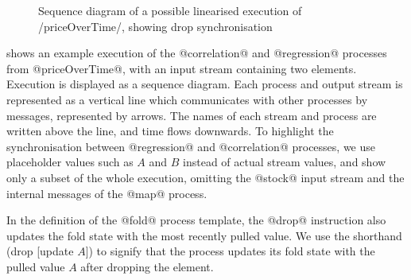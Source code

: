 \begin{figure}
\center
\begin{sequencediagram}









\end{sequencediagram}
\caption[Sequence diagram of execution with drop synchronisation]{Sequence diagram of a possible linearised execution of \Hs/priceOverTime/, showing drop synchronisation}
\label{figs/swim/drop/priceOverTime}
\end{figure}

 shows an example execution of the @correlation@ and @regression@ processes from @priceOverTime@, with an input stream containing two elements.
Execution is displayed as a sequence diagram.
Each process and output stream is represented as a vertical line which communicates with other processes by messages, represented by arrows.
The names of each stream and process are written above the line, and time flows downwards.
To highlight the synchronisation between @regression@ and @correlation@ processes, we use placeholder values such as $A$ and $B$ instead of actual stream values, and show only a subset of the whole execution, omitting the @stock@ input stream and the internal messages of the @map@ process.

In the definition of the @fold@ process template, the @drop@ instruction also updates the fold state with the most recently pulled value.
We use the shorthand (drop [update $A$]) to signify that the process updates its fold state with the pulled value $A$ after dropping the element.

